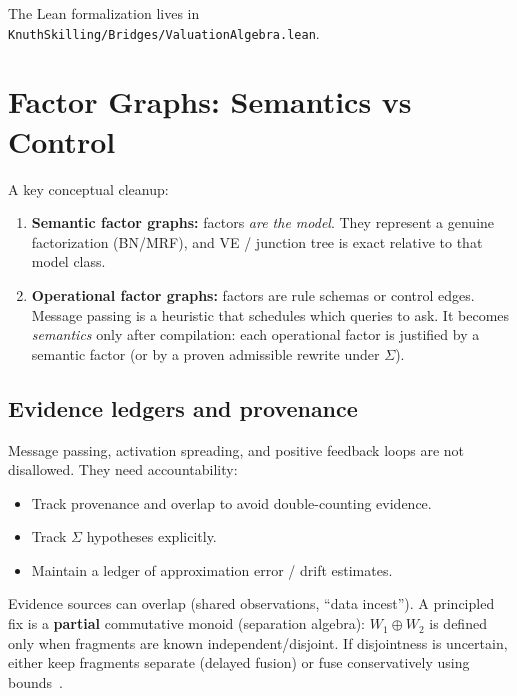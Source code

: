 \documentclass[]{article}
\newcommand{\code}[1]{\texttt{#1}}
\newcommand{\revise}{\mathbin{\oplus}}
\begin{document}
The Lean formalization lives in
\code{KnuthSkilling/Bridges/ValuationAlgebra.lean}.


\section{Factor Graphs: Semantics vs Control}
\label{sec:fg}

A key conceptual cleanup:

\begin{enumerate}[leftmargin=2em]
\item \textbf{Semantic factor graphs:} factors \emph{are the model}.
They represent a genuine factorization (BN/MRF), and VE / junction tree is
exact relative to that model class.
\item \textbf{Operational factor graphs:} factors are rule schemas or
control edges. Message passing is a heuristic that schedules which queries
to ask. It becomes \emph{semantics} only after compilation: each
operational factor is justified by a semantic factor (or by a proven
admissible rewrite under $\Sigma$).
\end{enumerate}


\subsection{Evidence ledgers and provenance}

Message passing, activation spreading, and positive feedback loops are not
disallowed. They need accountability:

\begin{itemize}[leftmargin=2em]
\item Track provenance and overlap to avoid double-counting evidence.
\item Track $\Sigma$ hypotheses explicitly.
\item Maintain a ledger of approximation error / drift estimates.
\end{itemize}

Evidence sources can overlap (shared observations, ``data incest'').
A principled fix is a \textbf{partial} commutative monoid (separation
algebra): $W_1 \revise W_2$ is defined only when fragments are known
independent/disjoint. If disjointness is uncertain, either keep fragments
separate (delayed fusion) or fuse conservatively using
bounds~\cite{Walley1996BagOfMarbles}.
\end{document}
